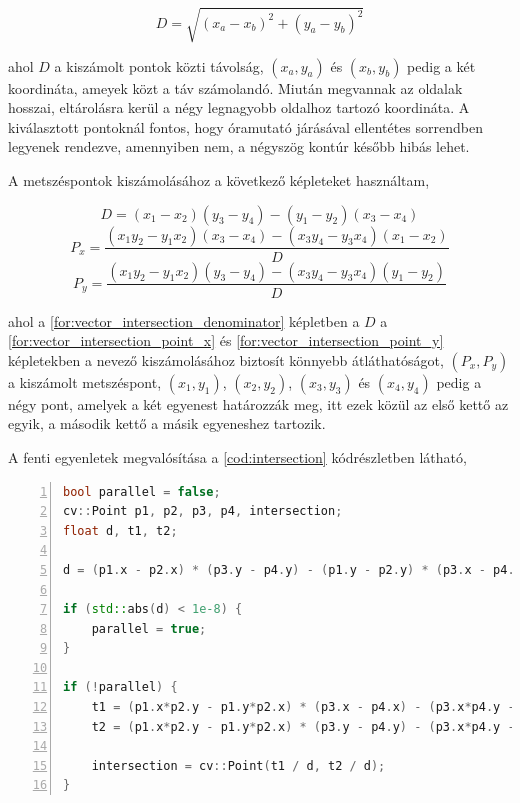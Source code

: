 \begin{equation}
    D = \sqrt{(x_a-x_b)^2 + (y_a-y_b)^2}
    \label{for:vector_distance}
\end{equation}

\par ahol $D$ a kiszámolt pontok közti távolság, $(x_a,y_a)$ és $(x_b,y_b)$ pedig a két koordináta, ameyek közt a táv számolandó. Miután megvannak az oldalak hosszai, eltárolásra kerül a négy legnagyobb oldalhoz tartozó koordináta. A kiválasztott pontoknál fontos, hogy óramutató járásával ellentétes sorrendben legyenek rendezve, amennyiben nem, a négyszög kontúr később hibás lehet.
\par A metszéspontok kiszámolásához a következő képleteket \cite{line_line} használtam,

\begin{equation}
    D = (x_1 - x_2)(y_3 - y_4) - (y_1 - y_2)(x_3 - x_4)
    \label{for:vector_intersection_denominator}
\end{equation}
\begin{equation}
    P_x = \frac{(x_1y_2 - y_1x_2)(x_3 - x_4) - (x_3y_4 - y_3x_4)(x_1 - x_2)}{D}
    \label{for:vector_intersection_point_x}
\end{equation}
\begin{equation}
    P_y = \frac{(x_1y_2 - y_1x_2)(y_3 - y_4) - (x_3y_4 - y_3x_4)(y_1 - y_2)}{D}
    \label{for:vector_intersection_point_y}
\end{equation}

\par ahol a \ref{for:vector_intersection_denominator} képletben a $D$ a \ref{for:vector_intersection_point_x} és \ref{for:vector_intersection_point_y} képletekben a nevező kiszámolásához biztosít könnyebb átláthatóságot, $(P_x, P_y)$ a kiszámolt metszéspont, $(x_1, y_1)$, $(x_2, y_2)$, $(x_3, y_3)$ és $(x_4, y_4)$ pedig a négy pont, amelyek a két egyenest határozzák meg, itt ezek közül az első kettő az egyik, a második kettő a másik egyeneshez tartozik.
\par A fenti egyenletek megvalósítása a \ref{cod:intersection} kódrészletben látható,

\vspace{5mm}
\hspace{-10mm}
\begin{minipage}{\linewidth}
\begin{lstlisting}[language=C++, numbers=left, caption={Metszéspont kereső algoritmus.}, label={cod:intersection}]
bool parallel = false;
cv::Point p1, p2, p3, p4, intersection;
float d, t1, t2;

d = (p1.x - p2.x) * (p3.y - p4.y) - (p1.y - p2.y) * (p3.x - p4.x);

if (std::abs(d) < 1e-8) {
    parallel = true;
}

if (!parallel) {
    t1 = (p1.x*p2.y - p1.y*p2.x) * (p3.x - p4.x) - (p3.x*p4.y - p3.y*p4.x) * (p1.x - p2.x);
    t2 = (p1.x*p2.y - p1.y*p2.x) * (p3.y - p4.y) - (p3.x*p4.y - p3.y*p4.x) * (p1.y - p2.y);
    
    intersection = cv::Point(t1 / d, t2 / d);
}
\end{lstlisting}
\end{minipage}

